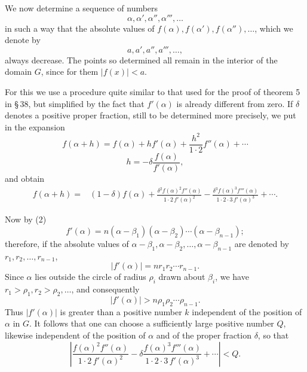\documentclass[11pt]{article}
\begin{document}
We now determine a sequence of numbers
\[
 \alpha,\alpha',\alpha'',\alpha''',\ldots
\]
in such a way that the absolute values of $f(\alpha),f(\alpha'),f(\alpha''),\ldots$, which we denote by
\[
 a,a',a'',a''',\ldots,
\]
always decrease. The points so determined all remain in the interior of the domain $G$, since for them $|f(x)|<a$.

For this we use a procedure quite similar to that used for the proof of theorem 5 in \S\,38, but simplified by the fact that $f'(\alpha)$ is already different from zero. If $\delta$ denotes a positive proper fraction, still to be determined more precisely, we put in the expansion
\begin{equation}
 f(\alpha+h)=f(\alpha)+h f'(\alpha)+\frac{h^2}{1\cdot2}f''(\alpha)+\cdots
\tag{6}
\end{equation}
\begin{equation}
 h=-\delta\frac{f(\alpha)}{f'(\alpha)},
\tag{7}
\end{equation}
and obtain
\begin{align}
 f(\alpha+h)={}&(1-\delta)f(\alpha)
 +\frac{\delta^2 f(\alpha)^2 f''(\alpha)}{1\cdot2\,f'(\alpha)^2}
 -\frac{\delta^3 f(\alpha)^3 f'''(\alpha)}{1\cdot2\cdot3\,f'(\alpha)^3}+\cdots .
\tag{8}
\end{align}

Now by (2)
\[
 f'(\alpha)=n(\alpha-\beta_1)(\alpha-\beta_2)\cdots(\alpha-\beta_{n-1});
\]
therefore, if the absolute values of $\alpha-\beta_1,\alpha-\beta_2,
\ldots,\alpha-\beta_{n-1}$ are denoted by $r_1,r_2,
\ldots,r_{n-1}$,
\[
 |f'(\alpha)|=nr_1r_2\cdots r_{n-1}.
\]
Since $\alpha$ lies outside the circle of radius $\rho_i$ drawn about $\beta_i$, we have $r_1>\rho_1,r_2>\rho_2,\ldots$, and consequently
\[
 |f'(\alpha)|>n\rho_1\rho_2\cdots\rho_{n-1}.
\]
Thus $|f'(\alpha)|$ is greater than a positive number $k$ independent of the position of $\alpha$ in $G$. It follows that one can choose a sufficiently large positive number $Q$, likewise independent of the position of $\alpha$ and of the proper fraction $\delta$, so that
\begin{equation}
 \left|\frac{f(\alpha)^2f''(\alpha)}{1\cdot2\,f'(\alpha)^2}
 -\delta\frac{f(\alpha)^3f'''(\alpha)}{1\cdot2\cdot3\,f'(\alpha)^3}+\cdots\right|<Q .
\tag{9}
\end{equation}
\end{document}
